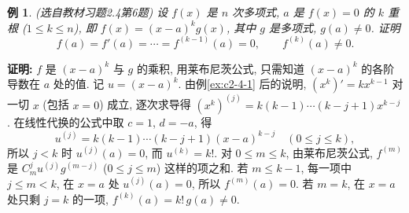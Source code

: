 \documentclass[UTF8,openany]{ctexbook}
\theoremstyle{chinesetextbook}
\newtheorem{example}{例}[section]
\newenvironment{cnproof}{\par\indent\textbf{证明:} \ignorespaces}{\par}
\begin{document}
\begin{example}\label{ex:c2-h4-6}
\textnormal{(选自教材习题2.4第6题)} 设 $f(x)$ 是 $n$ 次多项式, $a$ 是 $f(x)=0$ 的 $k$ 重根 ($1\le k\le n$), 即 $f(x)=(x-a)^kg(x)$, 其中 $g$ 是多项式, $g(a)\ne0$. 证明
\[
f(a)=f'(a)=\cdots=f^{(k-1)}(a)=0,\qquad f^{(k)}(a)\ne0.
\]
\end{example}
\begin{cnproof}
$f$ 是 $(x-a)^k$ 与 $g$ 的乘积, 用莱布尼茨公式, 只需知道 $(x-a)^k$ 的各阶导数在 $a$ 处的值. 记 $u=(x-a)^k$. 由例\ref{ex:c2-4-1} 后的说明, $(x^k)'=kx^{k-1}$ 对一切 $x$ (包括 $x=0$) 成立, 逐次求导得 $(x^k)^{(j)}=k(k-1)\cdots(k-j+1)x^{k-j}$. 在线性代换的公式中取 $c=1$, $d=-a$, 得
\[
u^{(j)}=k(k-1)\cdots(k-j+1)(x-a)^{k-j}\quad(0\le j\le k),
\]
所以 $j<k$ 时 $u^{(j)}(a)=0$, 而 $u^{(k)}=k!$. 对 $0\le m\le k$, 由莱布尼茨公式, $f^{(m)}$ 是 $C_m^ju^{(j)}g^{(m-j)}$ ($0\le j\le m$) 这样的项之和. 若 $m\le k-1$, 每一项中 $j\le m<k$, 在 $x=a$ 处 $u^{(j)}(a)=0$, 所以 $f^{(m)}(a)=0$. 若 $m=k$, 在 $x=a$ 处只剩 $j=k$ 的一项, $f^{(k)}(a)=k!\,g(a)\ne0$.
\end{cnproof}
\end{document}
